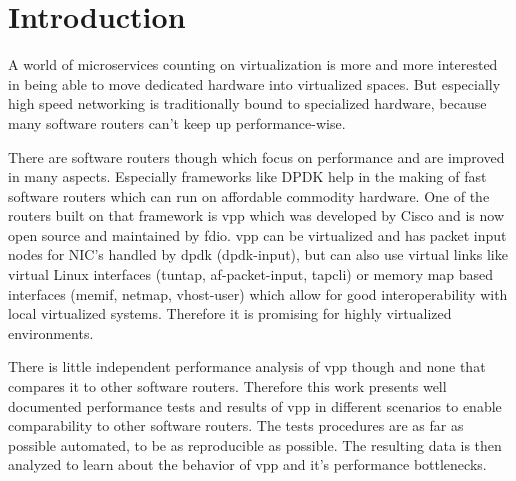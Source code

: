 
\chapter{Introduction}


A world of microservices counting on virtualization is more and
more interested in being able to move dedicated hardware into
virtualized spaces. But especially high speed networking is
traditionally bound to specialized hardware, because many software
routers can't keep up performance-wise.


There are software routers though which focus on performance and are
improved in many aspects. Especially frameworks like DPDK
\cite{inteldpdk} help in the making of fast software routers which can
run on affordable commodity hardware. One of the routers built on that
framework is \Ac{vpp} which was developed by Cisco and is now open
source and maintained by \Ac{fdio}. \Ac{vpp} can be virtualized and
has packet input nodes for NIC's handled by \Ac{dpdk} (dpdk-input),
but can also use virtual links like virtual Linux interfaces (tuntap,
af-packet-input, tapcli) or memory map based interfaces (memif,
netmap, vhost-user) which allow for good interoperability with local
virtualized systems. Therefore it is promising for highly virtualized
environments.




There is little independent performance analysis of \Ac{vpp} though
and none that compares it to other software routers. Therefore this
work presents well documented \cite{my:repo} performance tests and
results of \Ac{vpp} in different scenarios to enable comparability to
other software routers. The tests procedures are as far as possible
automated, to be as reproducible as possible. The resulting data is
then analyzed to learn about the behavior of \Ac{vpp} and it's
performance bottlenecks.

